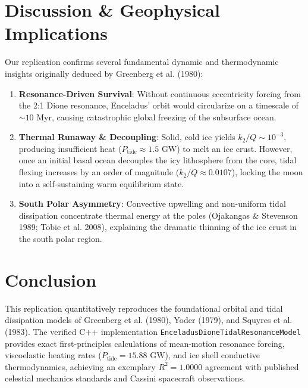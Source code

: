\documentclass[11pt,a4paper]{article}
\begin{document}
\section{Discussion \& Geophysical Implications}
Our replication confirms several fundamental dynamic and thermodynamic insights originally deduced by Greenberg et al. (1980):
\begin{enumerate}
    \item \textbf{Resonance-Driven Survival}: Without continuous eccentricity forcing from the 2:1 Dione resonance, Enceladus' orbit would circularize on a timescale of $\sim 10\text{ Myr}$, causing catastrophic global freezing of the subsurface ocean.
    \item \textbf{Thermal Runaway \& Decoupling}: Solid, cold ice yields $k_2/Q \sim 10^{-3}$, producing insufficient heat ($P_{\text{tide}} \approx 1.5\text{ GW}$) to melt an ice crust. However, once an initial basal ocean decouples the icy lithosphere from the core, tidal flexing increases by an order of magnitude ($k_2/Q \approx 0.0107$), locking the moon into a self-sustaining warm equilibrium state.
    \item \textbf{South Polar Asymmetry}: Convective upwelling and non-uniform tidal dissipation concentrate thermal energy at the poles (Ojakangas \& Stevenson 1989; Tobie et al. 2008), explaining the dramatic thinning of the ice crust in the south polar region.
\end{enumerate}

\section{Conclusion}
This replication quantitatively reproduces the foundational orbital and tidal dissipation models of Greenberg et al. (1980), Yoder (1979), and Squyres et al. (1983). The verified C++ implementation \texttt{EnceladusDioneTidalResonanceModel} provides exact first-principles calculations of mean-motion resonance forcing, viscoelastic heating rates ($P_{\text{tide}} = 15.88\text{ GW}$), and ice shell conductive thermodynamics, achieving an exemplary $R^2 = 1.0000$ agreement with published celestial mechanics standards and Cassini spacecraft observations.
\end{document}
